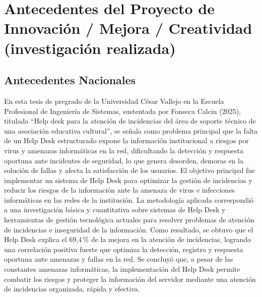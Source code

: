 \section{Antecedentes del Proyecto de Innovación / Mejora / Creatividad (investigación realizada)}

\subsection{Antecedentes Nacionales}

En esta tesis de pregrado de la Universidad César Vallejo en la Escuela Profesional de Ingeniería de Sistemas, sustentada por Fonseca Calcin (2025), titulada ``Help desk para la atención de incidencias del área de soporte técnico de una asociación educativa cultural'', se señala como problema principal que la falta de un Help Desk estructurado expone la información institucional a riesgos por virus y amenazas informáticas en la red, dificultando la detección y respuesta oportuna ante incidentes de seguridad, lo que genera desorden, demoras en la solución de fallas y afecta la satisfacción de los usuarios. El objetivo principal fue implementar un sistema de Help Desk para optimizar la gestión de incidencias y reducir los riesgos de la información ante la amenaza de virus e infecciones informáticas en las redes de la institución. La metodología aplicada correspondió a una investigación básica y cuantitativa sobre sistemas de Help Desk y herramientas de gestión tecnológica actuales para resolver problemas de atención de incidencias e inseguridad de la información. Como resultado, se obtuvo que el Help Desk explica el 69,4\,\% de la mejora en la atención de incidencias, logrando una correlación positiva fuerte que optimiza la detección, registro y respuesta oportuna ante amenazas y fallas en la red. Se concluyó que, a pesar de las constantes amenazas informáticas, la implementación del Help Desk permite combatir los riesgos y proteger la información del servidor mediante una atención de incidencias organizada, rápida y efectiva.

\vspace{0.8em}


